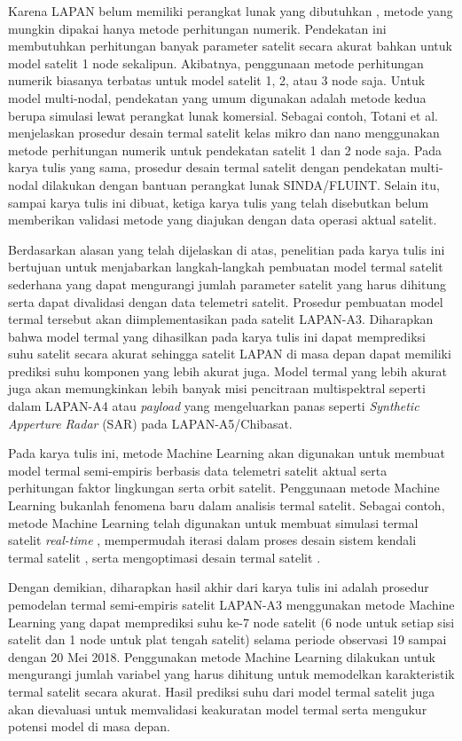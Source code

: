 Karena LAPAN belum memiliki perangkat lunak yang dibutuhkan
\cite{budiantoro2019}, metode yang mungkin dipakai hanya metode perhitungan
numerik. Pendekatan ini membutuhkan perhitungan banyak parameter satelit secara
akurat bahkan untuk model satelit 1 node sekalipun. Akibatnya, penggunaan
metode perhitungan numerik biasanya terbatas untuk model satelit 1, 2, atau 3
node saja. Untuk model multi-nodal, pendekatan yang umum digunakan adalah
metode kedua berupa simulasi lewat perangkat lunak komersial. Sebagai contoh,
Totani et al. \cite{totani2014} menjelaskan prosedur desain termal satelit
kelas mikro dan nano menggunakan metode perhitungan numerik untuk pendekatan
satelit 1 dan 2 node saja. Pada karya tulis yang sama, prosedur desain termal
satelit dengan pendekatan multi-nodal dilakukan dengan bantuan perangkat lunak
SINDA/FLUINT. Selain itu, sampai karya tulis ini dibuat, ketiga karya tulis
yang telah disebutkan belum memberikan validasi metode yang diajukan dengan
data operasi aktual satelit.

Berdasarkan alasan yang telah dijelaskan di atas, penelitian pada karya tulis
ini bertujuan untuk menjabarkan langkah-langkah pembuatan model termal satelit
sederhana yang dapat mengurangi jumlah parameter satelit yang harus dihitung
serta dapat divalidasi dengan data telemetri satelit. Prosedur pembuatan model
termal tersebut akan diimplementasikan pada satelit LAPAN-A3. Diharapkan bahwa
model termal yang dihasilkan pada karya tulis ini dapat memprediksi suhu
satelit secara akurat sehingga satelit LAPAN di masa depan dapat memiliki
prediksi suhu komponen yang lebih akurat juga. Model termal yang lebih akurat
juga akan memungkinkan lebih banyak misi pencitraan multispektral seperti dalam
LAPAN-A4 atau \textit{payload} yang mengeluarkan panas seperti
\textit{Synthetic Apperture Radar} (SAR) pada LAPAN-A5/Chibasat.


Pada karya tulis ini, metode Machine Learning akan digunakan untuk membuat
model termal semi-empiris berbasis data telemetri satelit aktual serta
perhitungan faktor lingkungan serta orbit satelit. Penggunaan metode Machine
Learning bukanlah fenomena baru dalam analisis termal satelit. Sebagai contoh,
metode Machine Learning telah digunakan untuk membuat simulasi termal satelit
\textit{real-time} \cite{junior2017}, mempermudah iterasi dalam proses desain
sistem kendali termal satelit \cite{escobar2016}, serta mengoptimasi desain termal satelit
\cite{xiong2020}.

Dengan demikian, diharapkan hasil akhir dari karya tulis ini adalah prosedur
pemodelan termal semi-empiris satelit LAPAN-A3 menggunakan metode Machine
Learning yang dapat memprediksi suhu ke-7 node satelit (6 node untuk setiap
sisi satelit dan 1 node untuk plat tengah satelit) selama periode observasi 19
sampai dengan 20 Mei 2018. Penggunakan metode Machine Learning dilakukan untuk
mengurangi jumlah variabel yang harus dihitung untuk memodelkan karakteristik
termal satelit secara akurat. Hasil prediksi suhu dari model termal satelit
juga akan dievaluasi untuk memvalidasi keakuratan model termal serta mengukur
potensi model di masa depan.

